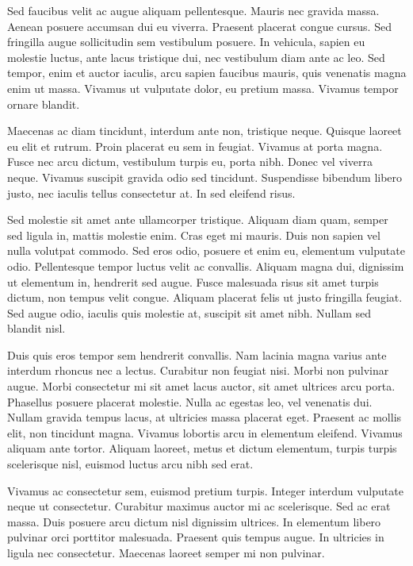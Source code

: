 \documentclass[a4paper,10pt,twoside]{article} %
\begin{document}
Sed faucibus velit ac augue aliquam pellentesque.
Mauris nec gravida massa.
Aenean posuere accumsan dui eu viverra.
Praesent placerat congue cursus.
Sed fringilla augue sollicitudin sem vestibulum posuere.
In vehicula, sapien eu molestie luctus, ante lacus tristique dui, nec vestibulum diam ante ac leo.
Sed tempor, enim et auctor iaculis, arcu sapien faucibus mauris, quis venenatis magna enim ut massa.
Vivamus ut vulputate dolor, eu pretium massa.
Vivamus tempor ornare blandit.

Maecenas ac diam tincidunt, interdum ante non, tristique neque.
Quisque laoreet eu elit et rutrum.
Proin placerat eu sem in feugiat.
Vivamus at porta magna.
Fusce nec arcu dictum, vestibulum turpis eu, porta nibh.
Donec vel viverra neque.
Vivamus suscipit gravida odio sed tincidunt.
Suspendisse bibendum libero justo, nec iaculis tellus consectetur at.
In sed eleifend risus.

Sed molestie sit amet ante ullamcorper tristique.
Aliquam diam quam, semper sed ligula in, mattis molestie enim.
Cras eget mi mauris.
Duis non sapien vel nulla volutpat commodo.
Sed eros odio, posuere et enim eu, elementum vulputate odio.
Pellentesque tempor luctus velit ac convallis.
Aliquam magna dui, dignissim ut elementum in, hendrerit sed augue.
Fusce malesuada risus sit amet turpis dictum, non tempus velit congue.
Aliquam placerat felis ut justo fringilla feugiat.
Sed augue odio, iaculis quis molestie at, suscipit sit amet nibh.
Nullam sed blandit nisl.

Duis quis eros tempor sem hendrerit convallis.
Nam lacinia magna varius ante interdum rhoncus nec a lectus.
Curabitur non feugiat nisi.
Morbi non pulvinar augue.
Morbi consectetur mi sit amet lacus auctor, sit amet ultrices arcu porta.
Phasellus posuere placerat molestie.
Nulla ac egestas leo, vel venenatis dui.
Nullam gravida tempus lacus, at ultricies massa placerat eget.
Praesent ac mollis elit, non tincidunt magna.
Vivamus lobortis arcu in elementum eleifend.
Vivamus aliquam ante tortor.
Aliquam laoreet, metus et dictum elementum, turpis turpis scelerisque nisl, euismod luctus arcu nibh sed erat.

Vivamus ac consectetur sem, euismod pretium turpis.
Integer interdum vulputate neque ut consectetur.
Curabitur maximus auctor mi ac scelerisque.
Sed ac erat massa.
Duis posuere arcu dictum nisl dignissim ultrices.
In elementum libero pulvinar orci porttitor malesuada.
Praesent quis tempus augue.
In ultricies in ligula nec consectetur.
Maecenas laoreet semper mi non pulvinar.
\end{document}
